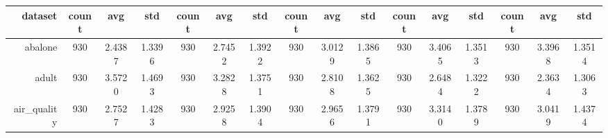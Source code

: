 \begin{table}[htbp]
{\begin{tabular}{rccccccccccccccc}
                  \cmidrule{2-16}    \textbf{dataset} & \textbf{count}                          & \textbf{avg}                                                                       & \textbf{std}    & \textbf{count}                  & \textbf{avg}                                                              & \textbf{std}    & \textbf{count}                  & \textbf{avg}    & \textbf{std}    & \textbf{count}                  & \textbf{avg}                                                              & \textbf{std}    & \textbf{count}                  & \textbf{avg}                                                              & \textbf{std}    \\
                  \midrule
                  abalone                             & 930                                     & \cellcolor[rgb]{ .776,  .937,  .808}\textcolor[rgb]{ 0,  .38,  0}{2.4387}          & 1.3396          & 930                             & 2.7452                                                                    & 1.3922          & 930                             & 3.0129          & 1.3865          & 930                             & 3.4065                                                                    & 1.3513          & 930                             & 3.3968                                                                    & 1.3514          \\
                  adult                               & 930                                     & 3.5720                                                                             & 1.4693          & 930                             & 3.2828                                                                    & 1.3751          & 930                             & 2.8108          & 1.3625          & 930                             & 2.6484                                                                    & 1.3222          & 930                             & \cellcolor[rgb]{ .776,  .937,  .808}\textcolor[rgb]{ 0,  .38,  0}{2.3634} & 1.3063          \\
                  air\_quality                        & 930                                     & \cellcolor[rgb]{ .776,  .937,  .808}\textcolor[rgb]{ 0,  .38,  0}{2.7527}          & 1.4283          & 930                             & 2.9258                                                                    & 1.3904          & 930                             & 2.9656          & 1.3791          & 930                             & 3.3140                                                                    & 1.3789          & 930                             & 3.0419                                                                    & 1.4374          \\

\end{tabular}}
\end{table}
